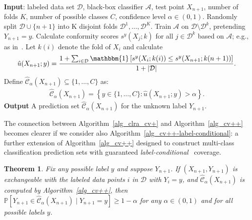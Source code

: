 \documentclass[11pt]{article}
\newtheorem{theorem}{Theorem}
\renewcommand{\P}[1]{\mathbb{P}\left[#1\right]}
\newcommand{\I}[1]{\mathbbm{1}\left[#1\right]}
\begin{document}
\begin{algorithm}[H]
  \caption{TCV+ prediction sets  for multi-class classification}
  \label{alg_cv++}
  \begin{algorithmic}[1]
    \State \textbf{Input}: labeled data set $\mathcal{D}$, black-box classifier  $\mathcal{A}$, test point $X_{n+1}$, number of folds $K$, number of possible classes $C$, confidence level $\alpha \in (0,1)$.
    \State Randomly split $\mathcal{D} \cup \{n+1\}$ into K disjoint folds $\mathcal{D}^1, \dots, \mathcal{D}^K$.
    \State Train $\mathcal{A}$ on $\mathcal{D} \setminus \mathcal{D}^k$, pretending $Y_{n+1}=y$.
    \State Calculate conformity scores $s^y(X_j; k)$ for all $j\in \mathcal{D}^k$ based on $\mathcal{A}$; e.g., as in~\cite{romano2020classification}.
    \EndFor
    \State Let $k(i)$ denote the fold of $X_i$ and calculate
    \begin{align*}
      \hat{u}(X_{n+1}; y) = \frac{1+\sum_{i \in \mathcal{D}} \I{ s^y(X_{i}; k(i)) \leq s^y(X_{n+1}; k(n+1))} }{1+|\mathcal{D}|}.
    \end{align*}
    Define $\hat{\mathcal{C}}_{\alpha}(X_{n+1}) \subseteq \{1,\ldots, C\}$  as:
    \begin{align*}
      \hat{\mathcal{C}}_{\alpha}(X_{n+1}) = \left\{ y \in \{1,\ldots, C\} : \hat{u}(X_{n+1}; y) > \alpha \right\}.
    \end{align*}
  \EndFor
    \State \textbf{Output} A prediction set $\hat{\mathcal{C}}_{\alpha}(X_{n+1})$ for the unknown label $Y_{n+1}$.
  \end{algorithmic}
\end{algorithm}

The connection between Algorithm~\ref{alg_clra_cv+} and Algorithm~\ref{alg_cv++} becomes clearer if we consider also Algorithm~\ref{alg_cv++-label-conditional}: a further extension of Algorithm~\ref{alg_cv++} designed to construct multi-class classification prediction sets with guaranteed {\em label-conditional}~\cite{vovk2005algorithmic,sadinle2019least,romano2020classification} coverage.

\begin{theorem} \label{theorem:general_tcv+-label-conditional}
Fix any possible label $y$ and suppose $Y_{n+1}$.
  If $(X_{n+1},Y_{n+1})$ is exchangeable with the labeled data points $i$ in $\mathcal{D}$ with $Y_i=y$, and $\hat{\mathcal{C}}_{\alpha}(X_{n+1})$ is computed by Algorithm~\ref{alg_cv++}, then $\P{Y_{n+1} \in \hat{\mathcal{C}}_{\alpha}(X_{n+1}) \mid Y_{n+1} = y} \geq 1-\alpha$ for any $\alpha \in (0,1)$ and for all possible labels $y$.
\end{theorem}
\end{document}
